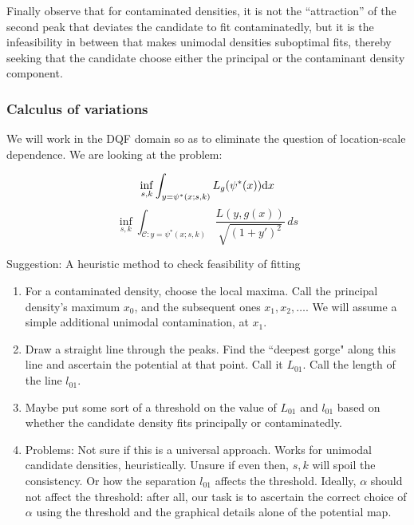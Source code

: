 Finally observe that for contaminated densities, it is not the ``attraction'' of the second peak that deviates the candidate to fit contaminatedly, but it is the infeasibility in between that makes unimodal densities suboptimal fits, thereby seeking that the candidate choose either the principal or the contaminant density component.

\subsubsection{Calculus of variations}
We will work in the DQF domain so as to eliminate the question of location-scale dependence. We are looking at the problem:

\[ \inf_{s,k} \int_{y=\psi^*(x;s,k)} L_g(\psi^*(x)) \mathrm d x \]
\[\inf_{s,k} \int_{\mathcal{C}: y=\psi^*(x; s,k)} \frac{L(y, g(x))}{\sqrt{(1 + y')^2}} \, ds\]


Suggestion: A heuristic method to check feasibility of fitting
\begin{enumerate}
	\item For a contaminated density, choose the local maxima. Call the principal density's maximum $x_0$, and the subsequent ones $x_1, x_2, \dots$. We will assume a simple additional unimodal contamination, at $x_1$.
	\item Draw a straight line through the peaks. Find the ``deepest gorge" along this line and ascertain the potential at that point. Call it $L_{01}$. Call the length of the line $l_{01}$.
	\item Maybe put some sort of a threshold on the value of $L_{01}$ and $l_{01}$ based on whether the candidate density fits principally or contaminatedly.
	\item Problems: Not sure if this is a universal approach. Works for unimodal candidate densities, heuristically. Unsure if even then, $s,k$ will spoil the consistency. Or how the separation $l_{01}$ affects the threshold. Ideally, $\alpha$ should not affect the threshold: after all, our task is to ascertain the correct choice of $\alpha$ using the threshold and the graphical details alone of the potential map.
\end{enumerate}